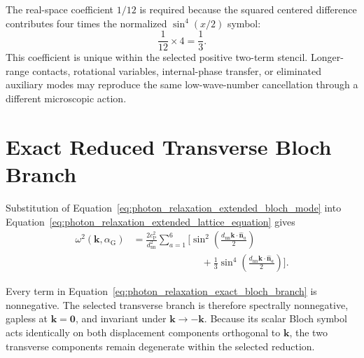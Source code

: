 The real-space coefficient \(1/12\) is required because the squared centered
difference contributes four times the normalized
\(\sin^4(x/2)\) symbol:
\[
    \frac{1}{12}\times4
    =
    \frac{1}{3}.
\]
This coefficient is unique within the selected positive two-term stencil.
Longer-range contacts, rotational variables, internal-phase transfer, or
eliminated auxiliary modes may reproduce the same low-wave-number
cancellation through a different microscopic action.


\section{Exact Reduced Transverse Bloch Branch}
\label{sec:photon_relaxation_exact_branch}

Substitution of
Equation~\eqref{eq:photon_relaxation_extended_bloch_mode} into
Equation~\eqref{eq:photon_relaxation_extended_lattice_equation} gives
\begin{align}
    \omega^2
    \left(
        \mathbf k,
        \alpha_{\mathrm G}
    \right)
    &=
    \frac{
        2c_{\mathrm P}^2
    }{
        d_{\mathrm{nn}}^2
    }
    \sum_{a=1}^{6}
    \Bigg[
        \sin^2
        \left(
            \frac{
                d_{\mathrm{nn}}
                \mathbf k\cdot
                \widehat{\mathbf n}_a
            }{
                2
            }
        \right)
    \nonumber\\
    &\hspace{7em}
        +
        \frac{1}{3}
        \sin^4
        \left(
            \frac{
                d_{\mathrm{nn}}
                \mathbf k\cdot
                \widehat{\mathbf n}_a
            }{
                2
            }
        \right)
    \Bigg].
    \label{eq:photon_relaxation_exact_bloch_branch}
\end{align}

Every term in
Equation~\eqref{eq:photon_relaxation_exact_bloch_branch} is nonnegative. The
selected transverse branch is therefore spectrally nonnegative, gapless at
\(\mathbf k=\mathbf 0\), and invariant under
\(\mathbf k\rightarrow-\mathbf k\).
Because its scalar Bloch symbol acts identically on both displacement
components orthogonal to \(\mathbf k\), the two transverse components remain
degenerate within the selected reduction.

